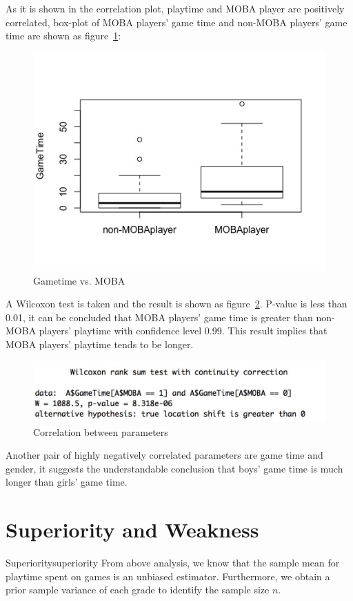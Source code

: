 \documentclass[scheme=plain]{ctexart}
\begin{document}
As it is shown in the correlation plot, playtime and MOBA player are positively correlated, box-plot of MOBA players' game time and non-MOBA players' game time are shown as figure~\ref{F:Data-5}:
\begin{figure}[H]
    \centering
    \includegraphics[width=.7\textwidth]{8}
    \caption{Gametime vs. MOBA}\label{F:Data-5}
\end{figure}

A Wilcoxon test is taken and the result is shown as figure~\ref{F:Data-6}. P-value is less than 0.01, it can be
concluded that MOBA players' game time is greater than non-MOBA players' playtime with confidence level 0.99. This result implies that MOBA players' playtime tends to be longer.
\begin{figure}[H]
    \centering
    \includegraphics[width=.7\textwidth]{9}
    \caption{Correlation between parameters}\label{F:Data-6}
\end{figure}

Another pair of highly negatively correlated parameters are game time and gender, it suggests the understandable conclusion that boys' game time is much longer than girls' game time.



\section{Superiority and Weakness}
\begin{analysis}{Superiority}{superiority}
From above analysis, we know that the sample mean for playtime spent on games is an unbiased estimator. Furthermore, we obtain a prior sample variance of each grade to identify the sample size $n$.
\end{analysis}
\end{document}
